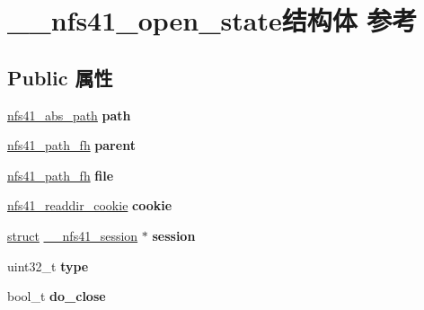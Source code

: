 \hypertarget{struct____nfs41__open__state}{}\section{\+\_\+\+\_\+nfs41\+\_\+open\+\_\+state结构体 参考}
\label{struct____nfs41__open__state}
\subsection*{Public 属性}
\begin{DoxyCompactItemize}
\item 
\mbox{\label{struct____nfs41__open__state_a03e2600804397893f240ff855c842552}} 
\hyperlink{struct____nfs41__abs__path}{nfs41\+\_\+abs\+\_\+path} {\bfseries path}
\item 
\mbox{\label{struct____nfs41__open__state_af65111765632e7153eb6d10764642df0}} 
\hyperlink{struct____nfs41__path__fh}{nfs41\+\_\+path\+\_\+fh} {\bfseries parent}
\item 
\mbox{\label{struct____nfs41__open__state_a711d04596dc67b99932e1f9dbd8d409b}} 
\hyperlink{struct____nfs41__path__fh}{nfs41\+\_\+path\+\_\+fh} {\bfseries file}
\item 
\mbox{\label{struct____nfs41__open__state_a7d1ae1935b00e8868aa5f9c4ac0849a4}} 
\hyperlink{struct____nfs41__readdir__cookie}{nfs41\+\_\+readdir\+\_\+cookie} {\bfseries cookie}
\item 
\mbox{\label{struct____nfs41__open__state_a3900f7398a15a0fbe5e4e5379b6452be}} 
\hyperlink{interfacestruct}{struct} \hyperlink{struct____nfs41__session}{\+\_\+\+\_\+nfs41\+\_\+session} $\ast$ {\bfseries session}
\item 
\mbox{\label{struct____nfs41__open__state_a0fd8b253ce4965c60dcd5ec394bdacc4}} 
uint32\+\_\+t {\bfseries type}
\item 
\mbox{\label{struct____nfs41__open__state_a088af391a2efb0a604104b4f63889c17}} 
bool\+\_\+t {\bfseries do\+\_\+close}
\item 

\end{DoxyCompactItemize}
